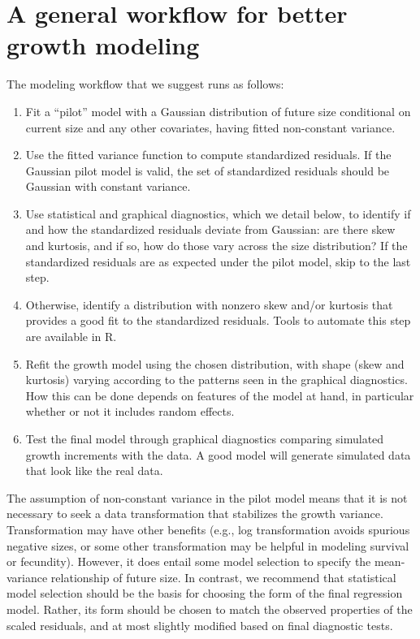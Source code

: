 \documentclass[11pt]{article}
\begin{document}
{\section{A general workflow for better growth modeling}

The modeling workflow that we suggest runs as follows:
\begin{enumerate}
\item Fit a ``pilot'' model with a Gaussian distribution of future size conditional on current size and any other covariates, 
having fitted non-constant variance. 
\item Use the fitted variance function to compute standardized residuals. If the Gaussian pilot model is valid, the set of standardized
residuals should be Gaussian with constant variance. 
\item Use statistical and graphical diagnostics, which we detail below, to identify if and how the standardized residuals deviate
from Gaussian: are there skew and kurtosis, and if so, how do those vary across the size distribution? If the standardized residuals
are as expected under the pilot model, skip to the last step. 
\item Otherwise, identify a distribution with nonzero skew and/or kurtosis that provides a good fit to the standardized residuals. Tools 
to automate this step are available in R. 
\item Refit the growth model using the chosen distribution, with shape (skew and kurtosis) varying according to the patterns 
seen in the graphical diagnostics. How this can be done depends on features of the model at hand, in particular whether or not it
includes random effects. 
\item Test the final model through graphical diagnostics comparing simulated growth increments with the data. A good model will generate
simulated data that look like the real data.   
\end{enumerate}
The assumption of non-constant variance in the pilot model means that it is not necessary to seek a data transformation that stabilizes
the growth variance. Transformation may have other benefits (e.g., log transformation avoids spurious negative sizes, or some other transformation
may be helpful in modeling survival or fecundity). However, it does entail some model selection to specify the mean-variance relationship of
future size. In contrast, we recommend that statistical model selection should be the basis for choosing the form of the final
regression model. Rather, its form should be chosen to match the observed properties of the scaled residuals, and at most slightly modified
based on final diagnostic tests.  


}
\end{document}
